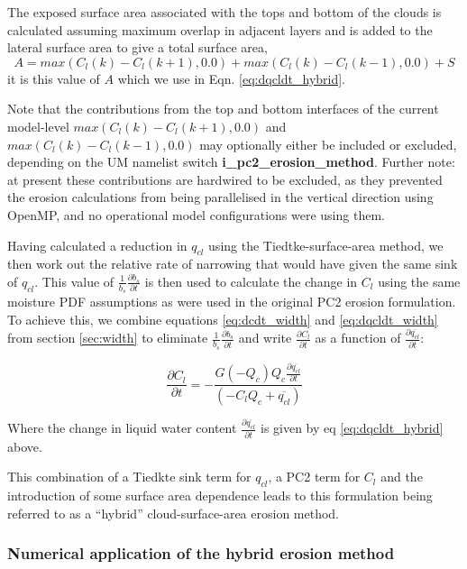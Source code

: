 \documentclass{UMDP_article}
\begin{document}
The exposed surface area associated with the tops and bottom of the clouds is calculated assuming maximum overlap in adjacent layers and is added to the lateral
surface area to give a total surface area, 
\begin{equation}
A=max(C_l(k)-C_l(k+1),0.0)+max(C_l(k)-C_l(k-1),0.0)+S
\label{eq:A_top_and_bottom} \end{equation}
it is this value of $A$ which we use in Eqn. \ref{eq:dqcldt_hybrid}.

Note that the contributions from the top and bottom interfaces of the current
model-level $max(C_l(k)-C_l(k+1),0.0)$ and $max(C_l(k)-C_l(k-1),0.0)$
may optionally either be included or excluded, depending on the
UM namelist switch \textbf{i\_pc2\_erosion\_method}.
Further note: at present these contributions are hardwired to be excluded,
as they prevented the erosion calculations from being parallelised
in the vertical direction using OpenMP, and no operational model configurations
were using them.

Having calculated a reduction in $q_{cl}$ using the Tiedtke-surface-area method, we
then work out the relative rate of narrowing that would have given the same sink of $q_{cl}$. This value of $\frac{1}{b_s} \frac{\partial b_s}{\partial t}$
is then used to calculate the change in $C_l$ using the same moisture PDF assumptions as were used in the original PC2 erosion formulation.
To achieve this, we combine equations \ref{eq:dcdt_width} and
\ref{eq:dqcldt_width} from section \ref{sec:width} to eliminate
$\frac{1}{b_s} \frac{\partial b_s}{\partial t}$ and write
$\frac{\partial C_l}{\partial t}$ as a function of
$\frac{\partial \overline{q_{cl}}}{\partial t}$:

\begin{equation}
\frac{\partial C_l}{\partial t}
 = - \frac{ G(-Q_c) Q_c \frac{\partial \overline{q_{cl}}}{\partial t} }
          { (- C_l Q_c+\overline{q_{cl}}) }
\label{eq:dcdt_hybrid}
\end{equation}

Where the change in liquid water content
$\frac{\partial \overline{q_{cl}}}{\partial t}$
is given by eq \ref{eq:dqcldt_hybrid} above.

This combination of a Tiedkte sink term for $q_{cl}$, a PC2 term for $C_l$ and the introduction of some surface area dependence leads to this formulation
being referred to as a ``hybrid'' cloud-surface-area erosion method.

\subsubsection{Numerical application of the hybrid erosion method}
\label{sec:erosion_numerics}
\end{document}
